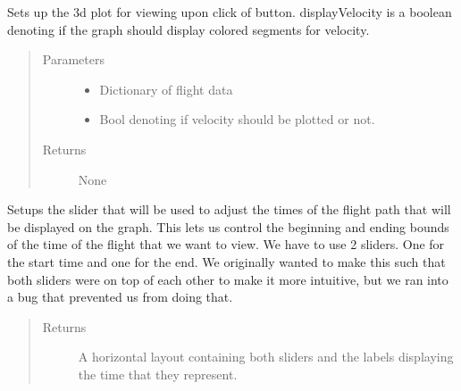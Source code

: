 \documentclass[letterpaper,10pt,english]{sphinxmanual}
\begin{document}
\begin{fulllineitems}
\begin{fulllineitems}
\begin{quote}
\begin{description}
\end{description}\end{quote}

\end{fulllineitems}


\begin{fulllineitems}
\label{\detokenize{index:src.Views.View_ReportScreen.ReportWindow.setupGraph}}
Sets up the 3d plot for viewing upon click of button. displayVelocity is a boolean denoting if the graph should
display colored segments for velocity.
\begin{quote}\begin{description}
\item[{Parameters}] \leavevmode\begin{itemize}
\item {} 
 \textendash{} Dictionary of flight data

\item {} 
 \textendash{} Bool denoting if velocity should be plotted or not.

\end{itemize}

\item[{Returns}] \leavevmode
None

\end{description}\end{quote}

\end{fulllineitems}


\begin{fulllineitems}
\label{\detokenize{index:src.Views.View_ReportScreen.ReportWindow.setupSlider}}
Setups the slider that will be used to adjust the times of the flight path that will be displayed
on the graph. This lets us control the beginning and ending bounds of the time of the flight
that we want to view. We have to use 2 sliders. One for the start time and one for the end.
We originally wanted to make this such that both sliders were on top of each other to make
it more intuitive, but we ran into a bug that prevented us from doing that.
\begin{quote}\begin{description}
\item[{Returns}] \leavevmode
A horizontal layout containing both sliders and the labels displaying the time that they represent.


\end{description}
\end{quote}
\end{fulllineitems}
\end{fulllineitems}
\end{document}
